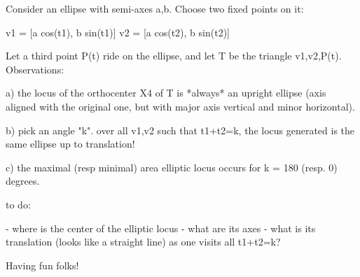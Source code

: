 Consider an ellipse with semi-axes a,b. Choose two fixed points on it:

v1 = [a cos(t1), b sin(t1)]
v2 = [a cos(t2), b sin(t2)]

Let a third point P(t) ride on the ellipse, and let T be the triangle {v1,v2,P(t)}. Observations:

a) the locus of the orthocenter X4 of T is *always* an upright ellipse (axis aligned with the original one, but with major axis vertical and minor horizontal).

b) pick an angle "k". over all v1,v2 such that t1+t2=k, the locus generated is the same ellipse up to translation!

c) the maximal (resp minimal) area elliptic locus occurs for k = 180 (resp. 0) degrees.

to do:

- where is the center of the elliptic locus
- what are its axes
- what is its translation (looks like a straight line) as one visits all t1+t2=k?

Having fun folks!